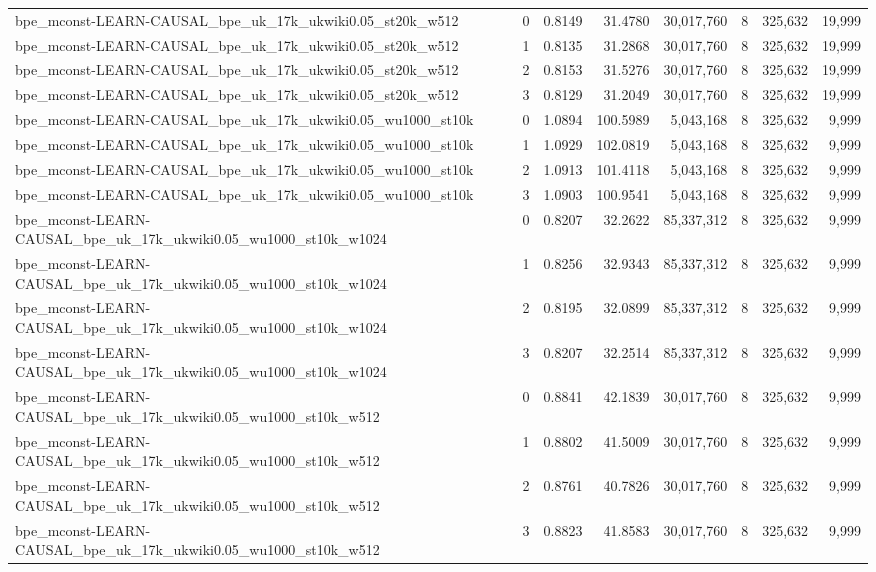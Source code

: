 \begin{tabular}{lrrrrrrr}
bpe\_mconst-LEARN-CAUSAL\_bpe\_uk\_17k\_ukwiki0.05\_st20k\_w512 & 0 & 0.8149 & 31.4780 & 30,017,760 & 8 & 325,632 & 19,999 \\
bpe\_mconst-LEARN-CAUSAL\_bpe\_uk\_17k\_ukwiki0.05\_st20k\_w512 & 1 & 0.8135 & 31.2868 & 30,017,760 & 8 & 325,632 & 19,999 \\
bpe\_mconst-LEARN-CAUSAL\_bpe\_uk\_17k\_ukwiki0.05\_st20k\_w512 & 2 & 0.8153 & 31.5276 & 30,017,760 & 8 & 325,632 & 19,999 \\
bpe\_mconst-LEARN-CAUSAL\_bpe\_uk\_17k\_ukwiki0.05\_st20k\_w512 & 3 & 0.8129 & 31.2049 & 30,017,760 & 8 & 325,632 & 19,999 \\
bpe\_mconst-LEARN-CAUSAL\_bpe\_uk\_17k\_ukwiki0.05\_wu1000\_st10k & 0 & 1.0894 & 100.5989 & 5,043,168 & 8 & 325,632 & 9,999 \\
bpe\_mconst-LEARN-CAUSAL\_bpe\_uk\_17k\_ukwiki0.05\_wu1000\_st10k & 1 & 1.0929 & 102.0819 & 5,043,168 & 8 & 325,632 & 9,999 \\
bpe\_mconst-LEARN-CAUSAL\_bpe\_uk\_17k\_ukwiki0.05\_wu1000\_st10k & 2 & 1.0913 & 101.4118 & 5,043,168 & 8 & 325,632 & 9,999 \\
bpe\_mconst-LEARN-CAUSAL\_bpe\_uk\_17k\_ukwiki0.05\_wu1000\_st10k & 3 & 1.0903 & 100.9541 & 5,043,168 & 8 & 325,632 & 9,999 \\
bpe\_mconst-LEARN-CAUSAL\_bpe\_uk\_17k\_ukwiki0.05\_wu1000\_st10k\_w1024 & 0 & 0.8207 & 32.2622 & 85,337,312 & 8 & 325,632 & 9,999 \\
bpe\_mconst-LEARN-CAUSAL\_bpe\_uk\_17k\_ukwiki0.05\_wu1000\_st10k\_w1024 & 1 & 0.8256 & 32.9343 & 85,337,312 & 8 & 325,632 & 9,999 \\
bpe\_mconst-LEARN-CAUSAL\_bpe\_uk\_17k\_ukwiki0.05\_wu1000\_st10k\_w1024 & 2 & 0.8195 & 32.0899 & 85,337,312 & 8 & 325,632 & 9,999 \\
bpe\_mconst-LEARN-CAUSAL\_bpe\_uk\_17k\_ukwiki0.05\_wu1000\_st10k\_w1024 & 3 & 0.8207 & 32.2514 & 85,337,312 & 8 & 325,632 & 9,999 \\
bpe\_mconst-LEARN-CAUSAL\_bpe\_uk\_17k\_ukwiki0.05\_wu1000\_st10k\_w512 & 0 & 0.8841 & 42.1839 & 30,017,760 & 8 & 325,632 & 9,999 \\
bpe\_mconst-LEARN-CAUSAL\_bpe\_uk\_17k\_ukwiki0.05\_wu1000\_st10k\_w512 & 1 & 0.8802 & 41.5009 & 30,017,760 & 8 & 325,632 & 9,999 \\
bpe\_mconst-LEARN-CAUSAL\_bpe\_uk\_17k\_ukwiki0.05\_wu1000\_st10k\_w512 & 2 & 0.8761 & 40.7826 & 30,017,760 & 8 & 325,632 & 9,999 \\
bpe\_mconst-LEARN-CAUSAL\_bpe\_uk\_17k\_ukwiki0.05\_wu1000\_st10k\_w512 & 3 & 0.8823 & 41.8583 & 30,017,760 & 8 & 325,632 & 9,999 \\

\end{tabular}
